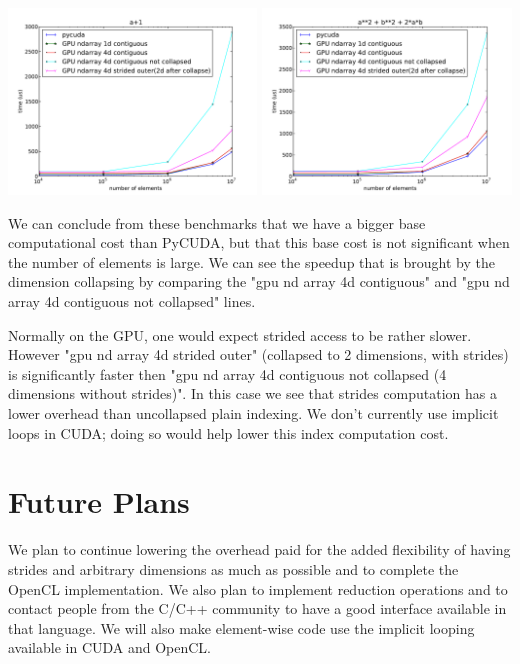 \documentclass{article} %
\begin{document}
\includegraphics[width=0.495\textwidth]{ap1_no_alloc}
\includegraphics[width=0.495\textwidth]{a2pb2p2ab_no_alloc}

We can conclude from these benchmarks that we have a bigger base computational cost than PyCUDA, but that this base cost is not significant when the number of elements is large.
We can see the speedup that is brought by the dimension collapsing by comparing the "gpu nd array 4d contiguous" and "gpu nd array 4d contiguous not collapsed" lines.

Normally on the GPU, one would expect strided access to be rather slower.
However "gpu nd array 4d strided outer" (collapsed to 2 dimensions, with strides) is significantly faster then "gpu nd array 4d contiguous not collapsed (4 dimensions without strides)".
In this case we see that strides computation has a lower overhead than uncollapsed plain indexing.
We don't currently use implicit loops in CUDA; doing so would help lower this index computation cost.

\section{Future Plans}

We plan to continue lowering the overhead paid for the added flexibility of having strides and arbitrary dimensions 
as much as possible and to complete the OpenCL implementation.
We also plan to implement reduction operations and to contact people from the C/C++ community to have a good interface available in that language.
We will also make element-wise code use the implicit looping available in CUDA and OpenCL.
\end{document}
